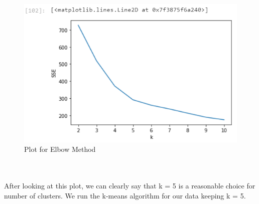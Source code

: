 \documentclass{article}
\begin{document}
\begin{figure}[h]
\caption{Plot for Elbow Method}
\centering
\includegraphics[width=\textwidth]{images/Screenshot (42).png}
\end{figure}\\\\
{After looking at this plot, we can clearly say that k = 5 is a reasonable choice for number of clusters. We run the k-means algorithm for our data keeping k = 5.}
\pagebreak
\end{document}
